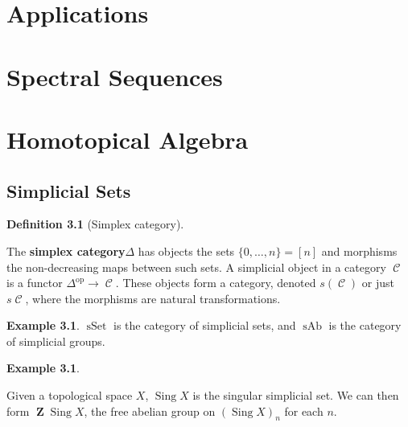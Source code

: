 \documentclass[10pt,]{book}
\newcommand{\terminology}[1]{\textbf{#1}}
\theoremstyle{plain}
\theoremstyle{definition}
\newtheorem{definition}[theorem]{Definition}
\newtheorem{example}[theorem]{Example}
\numberwithin{equation}{section}
\DeclareMathOperator{\op}{op}
\DeclareMathOperator{\Sing}{Sing}
\DeclareMathOperator{\sSet}{\text{sSet}}
\DeclareMathOperator{\sAb}{\text{sAb}}
\DeclareMathOperator{\cC}{\mathcal{C}}
\DeclareMathOperator{\ZZ}{\mathbf{Z}}
\begin{document}
\chapter[Applications]{Applications}\label{chap-apps}
\typeout{************************************************}
\typeout{************************************************}
\chapter[Spectral Sequences]{Spectral Sequences}\label{chap-spec-seq}
\typeout{************************************************}
\typeout{************************************************}
\chapter[Homotopical Algebra]{Homotopical Algebra}\label{chap-homotopical}
\typeout{************************************************}
\typeout{************************************************}
\section[Simplicial Sets]{Simplicial Sets}\label{sec-simplicial-sets}
\begin{definition}[Simplex category]\label{definition-25}

            The \terminology{simplex category}\(\Delta\) has objects the sets \(\{0,\ldots,n\} = [n]\) and morphisms the non-decreasing maps between such sets.
            A simplicial object in a category \(\cC\) is a functor \(\Delta^{\op} \to \cC\).
            These objects form a category, denoted \(s(\cC)\) or just \(s\cC\), where the morphisms are natural transformations.
          \end{definition}
\begin{example}\label{example-14}
\(\sSet\) is the category of simplicial sets, and \(\sAb\) is the category of simplicial groups.
          \end{example}
\begin{example}\label{example-15}

            Given a topological space \(X\), \(\Sing X\) is the singular simplicial set.
            We can then form \(\ZZ\Sing X\), the free abelian group on \((\Sing X)_n\) for each \(n\).
          \end{example}
\end{document}
